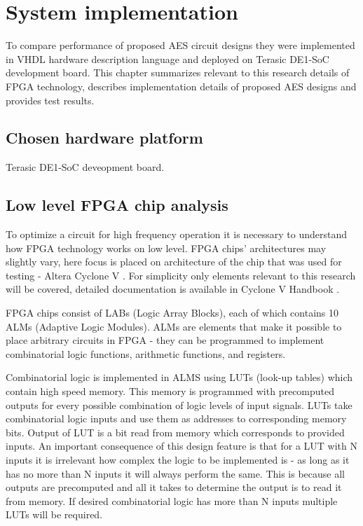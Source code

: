 \section{System implementation}
To compare performance of proposed AES circuit designs they were implemented in VHDL hardware description language and deployed on Terasic DE1-SoC development board. This chapter summarizes relevant to this research details of FPGA technology, describes implementation details of proposed AES designs and provides test results.
   
\subsection{Chosen hardware platform}
Terasic DE1-SoC deveopment board.

\subsection{Low level FPGA chip analysis}
\label{sec:low-level-fpga}
To optimize a circuit for high frequency operation it is necessary to understand how FPGA technology works on low level. FPGA chips' architectures may slightly vary, here focus is placed on architecture of the chip that was used for testing - Altera Cyclone V \cite[Chapter 1]{altera-vol1}. For simplicity only elements relevant to this research will be covered, detailed documentation is available in Cyclone V Handbook \cite{altera-vol1}.

FPGA chips consist of LABs (Logic Array Blocks), each of which contains 10 ALMs (Adaptive Logic Modules). ALMs are elements that make it possible to place arbitrary circuits in FPGA - they can be programmed to implement combinatorial logic functions, arithmetic functions, and registers.

Combinatorial logic is implemented in ALMS using LUTs (look-up tables) which contain high speed memory. This memory is programmed with precomputed outputs for every possible combination of logic levels of input signals. LUTs take combinatorial logic inputs and use them as addresses to corresponding memory bits. Output of LUT is a bit read from memory which corresponds to provided inputs. An important consequence of this design feature is that for a LUT with N inputs it is irrelevant how complex the logic to be implemented is - as long as it has no more than N inputs it will always perform the same. This is because all outputs are precomputed and all it takes to determine the output is to read it from memory. If desired combinatorial logic has more than N inputs multiple LUTs will be required.

